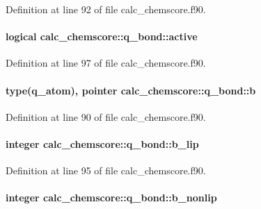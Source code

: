 Definition at line 92 of file calc\-\_\-chemscore.\-f90.

\hypertarget{structcalc__chemscore_1_1q__bond_a2edb791da9cb56771f1a27cab956e665}{
\paragraph[{active}]{\setlength{\rightskip}{0pt plus 5cm}logical calc\-\_\-chemscore\-::q\-\_\-bond\-::active}}\label{structcalc__chemscore_1_1q__bond_a2edb791da9cb56771f1a27cab956e665}


Definition at line 97 of file calc\-\_\-chemscore.\-f90.

\hypertarget{structcalc__chemscore_1_1q__bond_a93277ad371a3d42f2f9db5ca5a9851b2}{
\paragraph[{b}]{\setlength{\rightskip}{0pt plus 5cm}type({\bf q\-\_\-atom}), pointer calc\-\_\-chemscore\-::q\-\_\-bond\-::b}}\label{structcalc__chemscore_1_1q__bond_a93277ad371a3d42f2f9db5ca5a9851b2}


Definition at line 90 of file calc\-\_\-chemscore.\-f90.

\hypertarget{structcalc__chemscore_1_1q__bond_aa36febc28cb8280703698681883fce2e}{
\paragraph[{b\-\_\-lip}]{\setlength{\rightskip}{0pt plus 5cm}integer calc\-\_\-chemscore\-::q\-\_\-bond\-::b\-\_\-lip}}\label{structcalc__chemscore_1_1q__bond_aa36febc28cb8280703698681883fce2e}


Definition at line 95 of file calc\-\_\-chemscore.\-f90.

\hypertarget{structcalc__chemscore_1_1q__bond_a238ba76aa6e48069fbf597217892b6a3}{
\paragraph[{b\-\_\-nonlip}]{\setlength{\rightskip}{0pt plus 5cm}integer calc\-\_\-chemscore\-::q\-\_\-bond\-::b\-\_\-nonlip}}\label{structcalc__chemscore_1_1q__bond_a238ba76aa6e48069fbf597217892b6a3}



